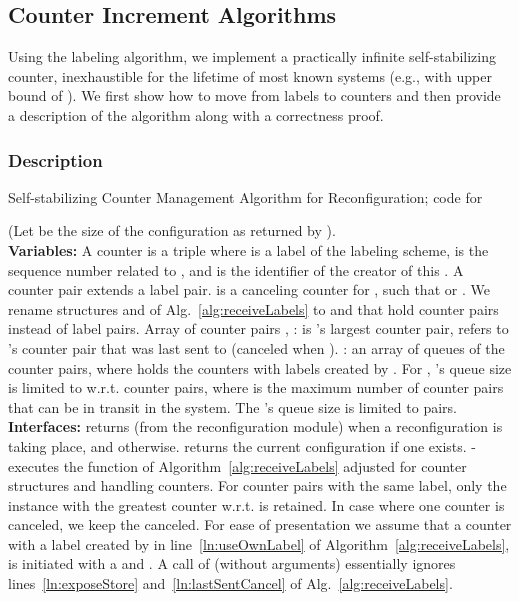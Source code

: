 \documentclass[11pt]{article}
\begin{document}
\subsection{Counter Increment Algorithms}
\label{sec:counter} 
Using the labeling algorithm, we implement a practically infinite self-stabilizing counter, inexhaustible for the lifetime of most known systems (e.g., with upper bound of ).
We first show how to move from labels to counters and then provide a description of the algorithm along with a correctness proof.




\subsubsection{Description}

\begin{algorithm}
\caption{{Self-stabilizing Counter Management Algorithm for Reconfiguration; code for }}
\label{alg:configCounting}


\begin{footnotesize}
(Let  be the size of the configuration  as returned by ).\\
{\bf Variables:}
A counter is a triple  where  is a label of the labeling scheme,  is the sequence number related to , and  is the identifier of the creator of this . A counter pair  extends a label pair.  is a canceling counter for , such that  or . 
We rename structures  and  of Alg.~\ref{alg:receiveLabels} to   and  that hold counter pairs instead of label pairs.
Array  of counter pairs , :  is 's largest counter pair,  refers to 's  counter pair that was last sent to  (canceled when ).
: an array of queues of the counter pairs, where  holds the counters with labels created by . 
For , 's queue size is limited to  w.r.t. counter pairs, where  is the maximum number of counter pairs that can be in transit in the system. 
The 's queue size is limited to  pairs.
\label{CCT:var} \\

{\bf Interfaces:}
 returns  (from the reconfiguration module) when a reconfiguration is taking place, and  otherwise.
 returns the current configuration if one exists.
 - executes the function  of Algorithm~\ref{alg:receiveLabels} adjusted for counter structures and handling counters.
For counter pairs with the same  label, only the instance with the greatest counter w.r.t.  is retained. 
In case where one counter is canceled, we keep the canceled.
For ease of presentation we assume that a counter with a label created by  in line~\ref{ln:useOwnLabel} of Algorithm~\ref{alg:receiveLabels}, is initiated with a  and . A call of  (without arguments) essentially ignores lines~\ref{ln:exposeStore} and~\ref{ln:lastSentCancel} of Alg.~\ref{alg:receiveLabels}.


\end{footnotesize}
\end{algorithm}
\end{document}
